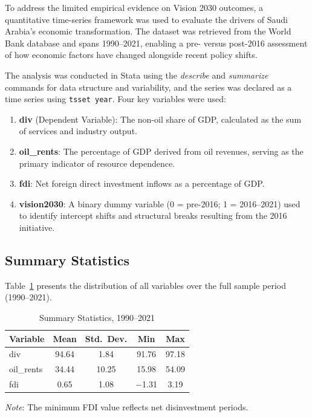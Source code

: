 \documentclass[12pt, a4paper]{article}
\begin{document}
To address the limited empirical evidence on Vision 2030 outcomes, a quantitative time-series framework was used to evaluate the drivers of Saudi Arabia's economic transformation. The dataset was retrieved from the World Bank database and spans 1990--2021, enabling a pre- versus post-2016 assessment of how economic factors have changed alongside recent policy shifts.

The analysis was conducted in Stata using the \textit{describe} and \textit{summarize} commands for data structure and variability, and the series was declared as a time series using \texttt{tsset year}. Four key variables were used:

\begin{enumerate}
    \item \textbf{div} (Dependent Variable): The non-oil share of GDP, calculated as the sum of services and industry output.
    \item \textbf{oil\_rents}: The percentage of GDP derived from oil revenues, serving as the primary indicator of resource dependence.
    \item \textbf{fdi}: Net foreign direct investment inflows as a percentage of GDP.
    \item \textbf{vision2030}: A binary dummy variable (0 = pre-2016; 1 = 2016--2021) used to identify intercept shifts and structural breaks resulting from the 2016 initiative.
\end{enumerate}

\subsection{Summary Statistics}

Table~\ref{tab:summary} presents the distribution of all variables over the full sample period (1990--2021).

\begin{table}[H]
\centering
\begin{threeparttable}
\caption{Summary Statistics, 1990--2021}
\label{tab:summary}
\begin{tabular}{lcccc}
    \toprule
    \textbf{Variable} & \textbf{Mean} & \textbf{Std.\ Dev.} & \textbf{Min} & \textbf{Max} \\
    \midrule
    div        & 94.64 & 1.84  & 91.76  & 97.18 \\
    oil\_rents & 34.44 & 10.25 & 15.98  & 54.09 \\
    fdi        & 0.65  & 1.08  & $-$1.31 & 3.19  \\
    \bottomrule
\end{tabular}
\begin{tablenotes}
    \small
    \item \textit{Note}: The minimum FDI value reflects net disinvestment periods.
\end{tablenotes}
\end{threeparttable}
\end{table}
\end{document}
